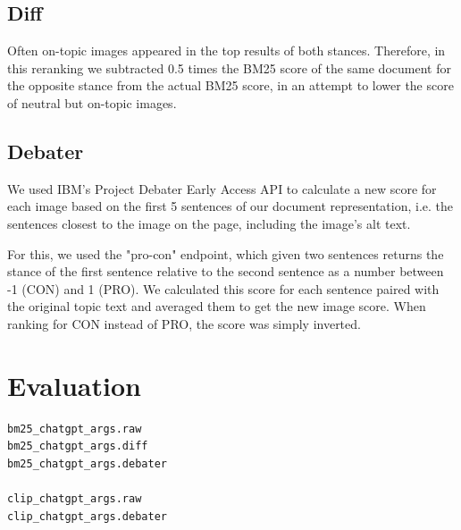 \documentclass[
]{ceurart}
\begin{document}
\subsection{Diff}

Often on-topic images appeared in the top results of both stances. Therefore, in this reranking we subtracted 0.5 times the BM25 score of the same document for the opposite stance from the actual BM25 score, in an attempt to lower the score of neutral but on-topic images.

\subsection{Debater}

We used IBM's Project Debater Early Access API \cite{barhaim2021project} to calculate a new score for each image based on the first 5 sentences of our document representation, i.e. the sentences closest to the image on the page, including the image's alt text.

For this, we used the "pro-con" endpoint, which given two sentences returns the stance of the first sentence relative to the second sentence as a number between -1 (CON) and 1 (PRO). We calculated this score for each sentence paired with the original topic text and averaged them to get the new image score. When ranking for CON instead of PRO, the score was simply inverted.

\section{Evaluation}

\begin{verbatim}
bm25_chatgpt_args.raw
bm25_chatgpt_args.diff
bm25_chatgpt_args.debater

clip_chatgpt_args.raw
clip_chatgpt_args.debater
\end{verbatim}


\end{document}
